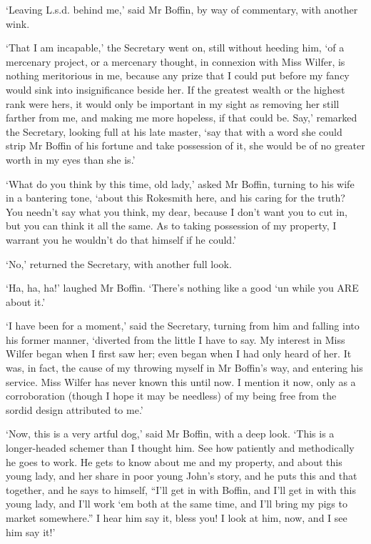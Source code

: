 ‘Leaving L.s.d. behind me,’ said Mr Boffin, by way of commentary, with
another wink.

‘That I am incapable,’ the Secretary went on, still without heeding him,
‘of a mercenary project, or a mercenary thought, in connexion with Miss
Wilfer, is nothing meritorious in me, because any prize that I could
put before my fancy would sink into insignificance beside her. If
the greatest wealth or the highest rank were hers, it would only be
important in my sight as removing her still farther from me, and making
me more hopeless, if that could be. Say,’ remarked the Secretary,
looking full at his late master, ‘say that with a word she could strip
Mr Boffin of his fortune and take possession of it, she would be of no
greater worth in my eyes than she is.’

‘What do you think by this time, old lady,’ asked Mr Boffin, turning to
his wife in a bantering tone, ‘about this Rokesmith here, and his caring
for the truth? You needn’t say what you think, my dear, because I don’t
want you to cut in, but you can think it all the same. As to taking
possession of my property, I warrant you he wouldn’t do that himself if
he could.’

‘No,’ returned the Secretary, with another full look.

‘Ha, ha, ha!’ laughed Mr Boffin. ‘There’s nothing like a good ‘un while
you ARE about it.’

‘I have been for a moment,’ said the Secretary, turning from him and
falling into his former manner, ‘diverted from the little I have to say.
My interest in Miss Wilfer began when I first saw her; even began when I
had only heard of her. It was, in fact, the cause of my throwing myself
in Mr Boffin’s way, and entering his service. Miss Wilfer has never
known this until now. I mention it now, only as a corroboration (though
I hope it may be needless) of my being free from the sordid design
attributed to me.’

‘Now, this is a very artful dog,’ said Mr Boffin, with a deep look.
‘This is a longer-headed schemer than I thought him. See how patiently
and methodically he goes to work. He gets to know about me and my
property, and about this young lady, and her share in poor young John’s
story, and he puts this and that together, and he says to himself, “I’ll
get in with Boffin, and I’ll get in with this young lady, and I’ll work
‘em both at the same time, and I’ll bring my pigs to market somewhere.”
 I hear him say it, bless you! I look at him, now, and I see him say it!’

